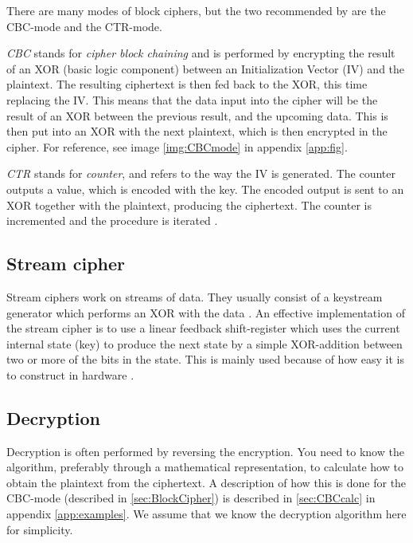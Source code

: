 There are many modes of block ciphers, but the two recommended by 
\citet{Schneier:2003} are the CBC-mode and the CTR-mode.

\emph{CBC} stands for \emph{cipher block chaining} and is performed by 
encrypting the result of an XOR (basic logic component) between 
an Initialization Vector (IV) and the plaintext. The resulting 
ciphertext is then fed back to the XOR, this time replacing the IV.
This means that the data input into the cipher will be the result of 
an XOR between the previous result, and the upcoming data. This is 
then put into an XOR with the next plaintext, which is then encrypted 
in the cipher. For reference, see image \ref{img:CBCmode} in 
appendix \ref{app:fig}. \citep[pp. 109--111]{Stinson:2006}

\emph{CTR} stands for \emph{counter}, and refers to the way the IV is 
generated. The counter outputs a value, which is encoded with the key. 
The encoded output is sent to an XOR together with the plaintext, 
producing the ciphertext. The counter is incremented and the procedure 
is iterated \citep[p. 111]{Stinson:2006}.

\subsection{Stream cipher} \label{sec:StreamCipher}
Stream ciphers work on streams of data. They usually consist of a 
keystream generator which performs an XOR with the data 
\cite[pp. 67]{Simmons:1992}. An effective implementation of the stream 
cipher is to use a linear feedback shift-register which uses the 
current internal state (key) to produce the next state by a simple 
XOR-addition between two or more of the bits in the state. This is 
mainly used because of how easy it is to construct in hardware 
\citep{LFSR:2008}.

\subsection{Decryption}
Decryption is often performed by reversing the encryption. You need to 
know the algorithm, preferably through a mathematical representation, 
to calculate how to obtain the plaintext from the ciphertext. A 
description of how this is done for the CBC-mode (described in 
\ref{sec:BlockCipher}) is described in \ref{sec:CBCcalc} in appendix 
\ref{app:examples}. We assume that we know the decryption algorithm 
here for simplicity. 


